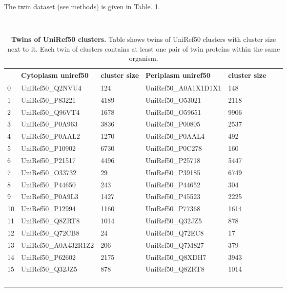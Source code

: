 The twin dataset (see methods) is given in Table. \ref{table:twins}.

~\begin{longtable}[]{@{}lllllll@{}}
\toprule
& Cytoplasm uniref50 & cluster size & Periplasm uniref50 & cluster size \tabularnewline
\midrule
\endhead
0 & UniRef50\_Q2NVU4 & 124 & UniRef50\_A0A1X1D1X1 & 148 \tabularnewline
1 & UniRef50\_P83221 & 4189 & UniRef50\_O53021 & 2118 \tabularnewline
2 & UniRef50\_Q96VT4 & 1678 & UniRef50\_O59651 & 9906 \tabularnewline
3 & UniRef50\_P0A963 & 3836 & UniRef50\_P00805 & 2537 \tabularnewline
4 & UniRef50\_P0AAL2 & 1270 & UniRef50\_P0AAL4 & 492 \tabularnewline
5 & UniRef50\_P10902 & 6730 & UniRef50\_P0C278 & 160 \tabularnewline
6 & UniRef50\_P21517 & 4496 & UniRef50\_P25718 & 5447 \tabularnewline
7 & UniRef50\_O33732 & 29 & UniRef50\_P39185 & 6749 \tabularnewline
8 & UniRef50\_P44650 & 243 & UniRef50\_P44652 & 304 \tabularnewline
9 & UniRef50\_P0A9L3 & 1427 & UniRef50\_P45523 & 2225 \tabularnewline
10 & UniRef50\_P12994 & 1160 & UniRef50\_P77368 & 1614 \tabularnewline
11 & UniRef50\_Q8ZRT8 & 1014 & UniRef50\_Q32JZ5 & 878 \tabularnewline
12 & UniRef50\_Q72CB8 & 24 & UniRef50\_Q72EC8 & 17 \tabularnewline
13 & UniRef50\_A0A432R1Z2 & 206 & UniRef50\_Q7M827 & 379 \tabularnewline
14 & UniRef50\_P62602 & 2175 & UniRef50\_Q8XDH7 & 3943 \tabularnewline
15 & UniRef50\_Q32JZ5 & 878 & UniRef50\_Q8ZRT8 & 1014 \tabularnewline
\bottomrule
\caption{\textbf{Twins of UniRef50 clusters.}
Table shows twins of UniRef50 clusters with cluster size next to it.
Each twin of clusters contains at least one pair of twin proteins within the same organism.}
\label{table:twins}
~\end{longtable}

